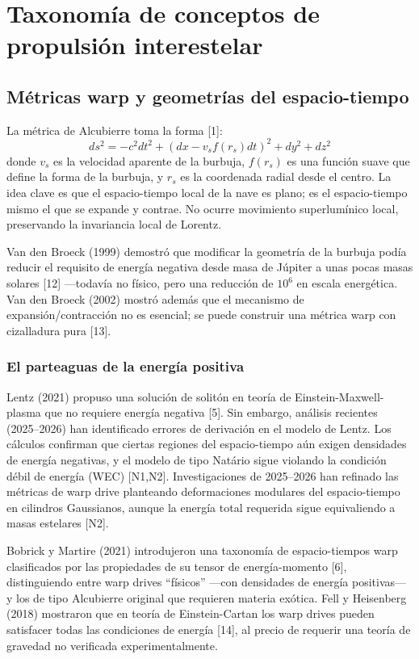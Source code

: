 \documentclass[11pt,a4paper,onecolumn]{article}
\begin{document}
\section{Taxonomía de conceptos de propulsión interestelar}

\subsection{Métricas warp y geometrías del espacio-tiempo}

La métrica de Alcubierre toma la forma [1]:
%
\begin{equation}
ds^2 = -c^2 dt^2 + (dx - v_s f(r_s) dt)^2 + dy^2 + dz^2
\end{equation}
%
donde $v_s$ es la velocidad aparente de la burbuja, $f(r_s)$ es una función suave que define la forma de la burbuja, y $r_s$ es la coordenada radial desde el centro. La idea clave es que el espacio-tiempo local de la nave es plano; es el espacio-tiempo mismo el que se expande y contrae. No ocurre movimiento superlumínico local, preservando la invariancia local de Lorentz.

Van den Broeck (1999) demostró que modificar la geometría de la burbuja podía reducir el requisito de energía negativa desde masa de Júpiter a unas pocas masas solares [12] —todavía no físico, pero una reducción de $10^6$ en escala energética. Van den Broeck (2002) mostró además que el mecanismo de expansión/contracción no es esencial; se puede construir una métrica warp con cizalladura pura [13].

\subsubsection{El parteaguas de la energía positiva}

Lentz (2021) propuso una solución de solitón en teoría de Einstein-Maxwell-plasma que no requiere energía negativa [5]. Sin embargo, análisis recientes (2025--2026) han identificado errores de derivación en el modelo de Lentz. Los cálculos confirman que ciertas regiones del espacio-tiempo aún exigen densidades de energía negativas, y el modelo de tipo Natário sigue violando la condición débil de energía (WEC) [N1,N2]. Investigaciones de 2025--2026 han refinado las métricas de warp drive planteando deformaciones modulares del espacio-tiempo en cilindros Gaussianos, aunque la energía total requerida sigue equivaliendo a masas estelares [N2].

Bobrick y Martire (2021) introdujeron una taxonomía de espacio-tiempos warp clasificados por las propiedades de su tensor de energía-momento [6], distinguiendo entre warp drives ``físicos'' —con densidades de energía positivas— y los de tipo Alcubierre original que requieren materia exótica. Fell y Heisenberg (2018) mostraron que en teoría de Einstein-Cartan los warp drives pueden satisfacer todas las condiciones de energía [14], al precio de requerir una teoría de gravedad no verificada experimentalmente.
\end{document}
